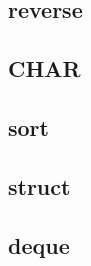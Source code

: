         \subsection{reverse}
                
        \subsection{CHAR}
                
        \subsection{sort}
                
        \subsection{struct}
                
        \subsection{deque}
                